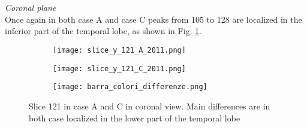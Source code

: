 \documentclass{article}
\begin{document}
	\\
	\\
	\textit{Coronal plane}
	\\
	Once again in both case A and case C peaks from 105 to 128 are localized in the inferior part of the temporal lobe, as shown in Fig. \ref{Fig: slices_121_casi}.


	\begin{figure} [h!]
		\centering
		\begin{subfigure} [b] {0.45\linewidth} 				\texttt{[image: slice\_y\_121\_A\_2011.png]}
		\end{subfigure}
		\hfill
		\begin{subfigure} [b] {0.45\linewidth} \texttt{[image: slice\_y\_121\_C\_2011.png]}
		\end{subfigure}
		\begin{subfigure} [b] {0.08\linewidth} \texttt{[image: barra\_colori\_differenze.png]}
		\end{subfigure}
		\caption{Slice 121 in case A and C in coronal view. Main differences are in both case localized in the lower part of the temporal lobe}
		\label{Fig: slices_121_casi}
	\end{figure}




	
	
	
	\newpage
\end{document}

